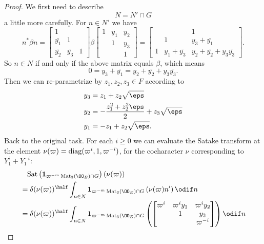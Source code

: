 \begin{proof}
  We first need to describe \[ N = N' \cap G \] a little more carefully.
  For $n \in N'$ we have
  \[
    n^\ast \beta n
    =
    \begin{bmatrix} 1 \\ \bar{y_1} & 1 \\ \bar{y_2} & \bar{y_3} & 1 \end{bmatrix}
    \beta
    \begin{bmatrix}
      1 & y_1 & y_2 \\
        & 1 & y_3 \\
        & & 1
    \end{bmatrix}
    = \begin{bmatrix}
      & & 1 \\
      & 1 & y_3 + \bar{y_1} \\
      1 & y_1 + \bar{y_3} & y_2 + \bar{y_2} + y_3 \bar{y_3}
    \end{bmatrix}.
  \]
  So $n \in N$ if and only if the above matrix equals $\beta$, which means
  \[ 0 = y_3 + \bar{y_1} = y_2 + \bar{y_2} + y_3 \bar{y_3}. \]
  Then we can re-parametrize by $z_1, z_2, z_3 \in F$ according to
  \begin{align*}
    y_3 &= z_1 + z_2 \sqrt\eps \\
    y_2 &= -\frac{z_1^2 + z_2^2 \eps}{2} + z_3\sqrt\eps \\
    y_1 &= -z_1 + z_2\sqrt\eps.
  \end{align*}
  Back to the original task.
  For each $i \ge 0$ we can evaluate the Satake transform at the element
  $\nu(\varpi) = \operatorname{diag}(\varpi^i, 1, \varpi^{-i})$, for the cocharacter $\nu$
  corresponding to $Y_1^i + Y_1^{-i}$:
  \begin{align*}
    &\phantom=
    \Sat\left( \mathbf{1}_{\varpi^{-m} \Mat_3(\OO_E) \cap G}\right)
      \left( \nu(\varpi)  \right) \\
    &= \delta(\nu(\varpi))^\half \int_{n \in N}
      \mathbf{1}_{\varpi^{-m} \Mat_3(\OO_E) \cap G}
      \left( \nu(\varpi) n' \right) \odif n \\
    &= \delta(\nu(\varpi))^\half \int_{n \in N}
      \mathbf{1}_{{\varpi^{-m}} \Mat_3(\OO_E) \cap G}
      \left( \begin{bmatrix} \varpi^i & \varpi^i y_1 & \varpi^i y_2 \\
               & 1 & y_3 \\
               & & \varpi^{-i} \end{bmatrix} \right) \odif n
  \end{align*}

\end{proof}
